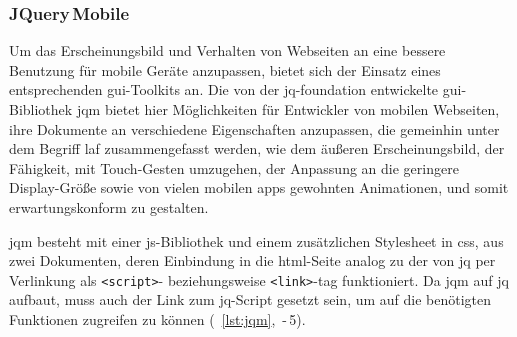 \subsubsection{JQuery\,Mobile}

Um das Erscheinungsbild und Verhalten von Webseiten an eine bessere Benutzung für mobile Geräte anzupassen, bietet sich der Einsatz eines entsprechenden \gls{gui}-Toolkits an. 
Die von der \gls{jq-foundation} entwickelte \gls{gui}-Bibliothek \gls{jqm} bietet hier Möglichkeiten für Entwickler von mobilen Webseiten, ihre Dokumente an verschiedene Eigenschaften anzupassen, die gemeinhin unter dem Begriff \gls{laf} zusammengefasst werden, wie dem äußeren Erscheinungsbild, der Fähigkeit, mit Touch-Gesten umzugehen, der Anpassung an die geringere Display-Größe sowie von vielen mobilen \glspl{app} gewohnten Animationen, und somit erwartungskonform zu gestalten.

\Gls{jqm} besteht mit einer \gls{js}-Bibliothek und einem zusätzlichen Stylesheet in \gls{css}, aus zwei Dokumenten, deren Einbindung in die \gls{html}-Seite analog zu der von \gls{jq} per Verlinkung als \verb|<script>|- beziehungsweise \verb|<link>|-\gls{tag} funktioniert.
Da \gls{jqm} auf \gls{jq} aufbaut, muss auch der Link zum \gls{jq}-Script gesetzt sein, um auf die benötigten Funktionen zugreifen zu können (\seename\ \autoref{lst:jqm}, \,-\,5).


	
